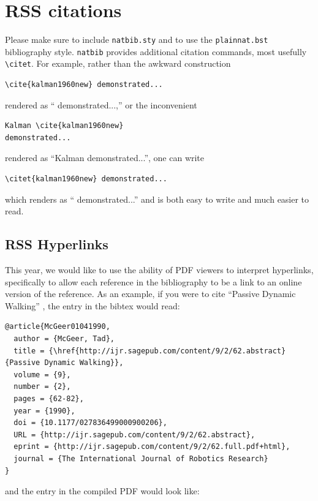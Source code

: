 \section{RSS citations}

Please make sure to include \verb!natbib.sty! and to use the
\verb!plainnat.bst! bibliography style. \verb!natbib! provides additional
citation commands, most usefully \verb!\citet!. For example, rather than the
awkward construction 

{\small
\begin{verbatim}
\cite{kalman1960new} demonstrated...
\end{verbatim}
}

\noindent
rendered as ``\cite{kalman1960new} demonstrated...,''
or the
inconvenient 

{\small
\begin{verbatim}
Kalman \cite{kalman1960new} 
demonstrated...
\end{verbatim}
}

\noindent
rendered as 
``Kalman \cite{kalman1960new} demonstrated...'', 
one can
write 

{\small
\begin{verbatim}
\citet{kalman1960new} demonstrated... 
\end{verbatim}
}
\noindent
which renders as ``\citet{kalman1960new} demonstrated...'' and is 
both easy to write and much easier to read.
  
\subsection{RSS Hyperlinks}

This year, we would like to use the ability of PDF viewers to interpret
hyperlinks, specifically to allow each reference in the bibliography to be a
link to an online version of the reference. 
As an example, if you were to cite ``Passive Dynamic Walking''
\cite{McGeer01041990}, the entry in the bibtex would read:

{\small
\begin{verbatim}
@article{McGeer01041990,
  author = {McGeer, Tad}, 
  title = {\href{http://ijr.sagepub.com/content/9/2/62.abstract}{Passive Dynamic Walking}}, 
  volume = {9}, 
  number = {2}, 
  pages = {62-82}, 
  year = {1990}, 
  doi = {10.1177/027836499000900206}, 
  URL = {http://ijr.sagepub.com/content/9/2/62.abstract}, 
  eprint = {http://ijr.sagepub.com/content/9/2/62.full.pdf+html}, 
  journal = {The International Journal of Robotics Research}
}
\end{verbatim}
}
\noindent
and the entry in the compiled PDF would look like:

